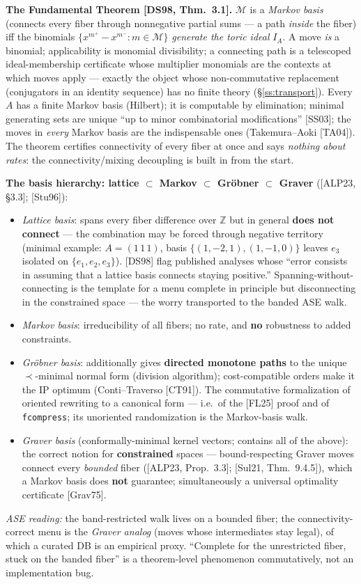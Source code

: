 \documentclass[11pt]{article}
\newcommand{\code}[1]{\texttt{#1}}
\begin{document}
\textbf{The Fundamental Theorem [DS98, Thm.~3.1].} $\mathcal{M}$ is a \emph{Markov basis} (connects
every fiber through nonnegative partial sums --- a path \emph{inside} the fiber) iff the binomials
$\{x^{m^+}-x^{m^-}: m\in\mathcal{M}\}$ \emph{generate the toric ideal} $I_A$. A move \emph{is} a
binomial; applicability is monomial divisibility; a connecting path is a telescoped ideal-membership
certificate whose multiplier monomials are the contexts at which moves apply --- exactly the object
whose non-commutative replacement (conjugators in an identity sequence) has no finite theory
(\S\ref{ss:transport}). Every $A$ has a finite Markov basis (Hilbert); it is computable by
elimination; minimal generating sets are unique ``up to minor combinatorial modifications'' [SS03]; the moves in
\emph{every} Markov basis are the indispensable ones (Takemura--Aoki [TA04]). The theorem certifies
connectivity of every fiber at once and says \emph{nothing about rates}: the connectivity/mixing
decoupling is built in from the start.

\textbf{The basis hierarchy: lattice $\subset$ Markov $\subset$ Gr\"obner $\subset$ Graver}
([ALP23, \S3.3]; [Stu96]):
\begin{itemize}
\item \emph{Lattice basis}: spans every fiber difference over $\mathbb{Z}$ but in general
\textbf{does not connect} --- the combination may be forced through negative territory (minimal
example: $A=(1\,1\,1)$, basis $\{(1,-2,1),(1,-1,0)\}$ leaves $e_3$ isolated on $\{e_1,e_2,e_3\}$).
[DS98] flag published analyses whose ``error consists in assuming that a lattice basis connects
staying positive.'' Spanning-without-connecting is the template for a menu complete in principle but
disconnecting in the constrained space --- the worry transported to the banded ASE walk.
\item \emph{Markov basis}: irreducibility of all fibers; no rate, and \textbf{no} robustness to
added constraints.
\item \emph{Gr\"obner basis}: additionally gives \textbf{directed monotone paths} to the unique
$\prec$-minimal normal form (division algorithm); cost-compatible orders make it the IP optimum
(Conti--Traverso [CT91]). The commutative formalization of oriented rewriting to a canonical form ---
i.e.\ of the [FL25] proof and of \code{fcompress}; its unoriented randomization is the Markov-basis walk.
\item \emph{Graver basis} (conformally-minimal kernel vectors; contains all of the above): the
correct notion for \textbf{constrained} spaces --- bound-respecting Graver moves connect every
\emph{bounded} fiber ([ALP23, Prop.~3.3]; [Sul21, Thm.~9.4.5]), which a Markov basis does
\textbf{not} guarantee; simultaneously a universal optimality certificate [Grav75].
\end{itemize}
\emph{ASE reading:} the band-restricted walk lives on a bounded fiber; the connectivity-correct menu
is the \emph{Graver analog} (moves whose intermediates stay legal), of which a curated DB is an
empirical proxy. ``Complete for the unrestricted fiber, stuck on the banded fiber'' is a
theorem-level phenomenon commutatively, not an implementation bug.
\end{document}
